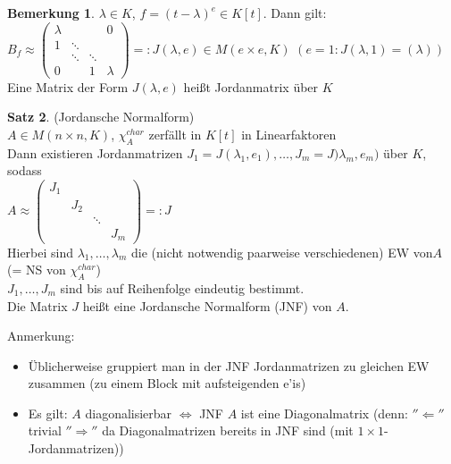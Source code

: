 \documentclass[10pt,a4paper,numbers=endperiod]{scrartcl}
\theoremstyle{definition}
\newtheorem{satz}{Satz}[section]
\newtheorem{bem}[satz]{Bemerkung}
\begin{document}
\begin{bem}
	$ \lambda \in K$, $f = (t-\lambda)^e \in K[t]$. Dann gilt:\\
	$B_f \approx \begin{pmatrix}
	\lambda & & & 0\\
	1 & \ddots & &\\
	& \ddots & \ddots &\\
	0 & &1 & \lambda
	\end{pmatrix} =: J(\lambda, e) \in M(e \times e, K)$ $(e = 1: J(\lambda, 1) = (\lambda))$\\
	Eine Matrix der Form $J(\lambda, e)$ heißt Jordanmatrix über $K$
\end{bem}
\newpage
\begin{satz}
	(Jordansche Normalform)\\
	$A \in M(n \times n, K)$, $\chi_A^{char}$ zerfällt in $K[t]$ in Linearfaktoren\\
	Dann existieren Jordanmatrizen $J_1 = J(\lambda_1, e_1), \ldots, J_m = J)\lambda_m,e_m)$ über $K$, sodass\\
	$A \approx \begin{pmatrix}
	J_1 & & &\\
	& J_2 & &\\
	& & \ddots &\\
	& & & J_m
	\end{pmatrix} =: J$\\
	Hierbei sind $\lambda_1, \ldots, \lambda_m$ die (nicht notwendig paarweise verschiedenen) EW von$A$ (= NS von $\chi_A^{char}$)\\
	$J_1, \ldots, J_m$ sind bis auf Reihenfolge eindeutig bestimmt.\\
	Die Matrix $J$ heißt eine Jordansche Normalform (JNF) von $A$.
\end{satz}

Anmerkung: \begin{itemize}
	\item Üblicherweise gruppiert man in der JNF Jordanmatrizen zu gleichen EW zusammen (zu einem Block mit aufsteigenden e'is)
	\item Es gilt: $A$ diagonalisierbar $\Leftrightarrow$ JNF $A$ ist eine Diagonalmatrix (denn: $''\Leftarrow''$ trivial $''\Rightarrow''$ da Diagonalmatrizen bereits in JNF sind (mit $1 \times 1$-Jordanmatrizen))
\end{itemize}
\end{document}
